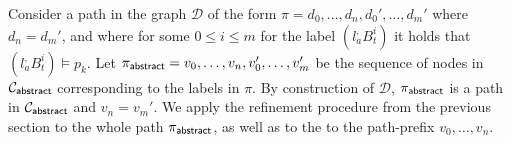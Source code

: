 Consider a path in the graph $\mathcal{D}$ of the form $\pi = d_0,\ldots, d_n,d_0',\ldots,d_m'$ where $d_n = d_m'$, and where for some $0 \leq i \leq m$ for the label $(l_a^,B_t^i)$ it holds that $(l_a^,B_t^i) \models p_k$. Let 
$\pi_{\mathsf{abstract}} = v_0,\ldots, v_n,v_0',\ldots,v_m'$ be the sequence of nodes in $\mathcal{C}_{\mathsf{abstract}}$ corresponding to the labels in $\pi$. By construction of $\mathcal D$, $\pi_{\mathsf{abstract}}$ is a path in $\mathcal{C}_{\mathsf{abstract}}$ and $v_n = v_m'$. We apply the refinement procedure from the previous section to the whole path $\pi_{\mathsf{abstract}}$, as well as to the to the path-prefix $v_0,\ldots, v_n$.

\begin{theorem}
\end{theorem}

\begin{example}
\end{example}
